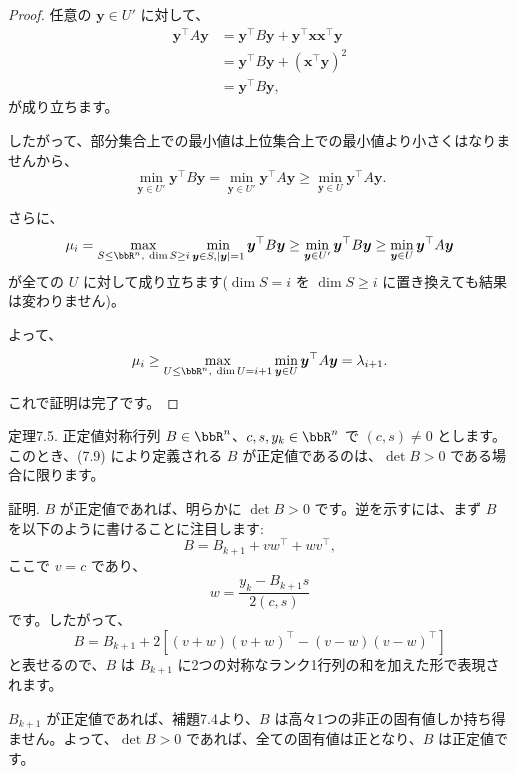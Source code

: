 \documentclass[a4paper, 10pt, dvipdfmx,draft]{article}
\begin{document}
\begin{proof}
    任意の $\bm{y} \in U'$ に対して、
    \begin{align*}
        \bm{y}^\top A \bm{y} & = \bm{y}^\top B \bm{y} + \bm{y}^\top \bm{x}\bm{x}^\top \bm{y} \\
                             & = \bm{y}^\top B \bm{y} + (\bm{x}^\top \bm{y})^2               \\
                             & = \bm{y}^\top B \bm{y},
    \end{align*}
    が成り立ちます。

    したがって、部分集合上での最小値は上位集合上での最小値より小さくはなりませんから、
    \begin{equation*}
        \min_{\bm{y} \in U'} \bm{y}^\top B \bm{y} = \min_{\bm{y} \in U'} \bm{y}^\top A \bm{y} \ge \min_{\bm{y} \in U} \bm{y}^\top A \bm{y}.
    \end{equation*}

    さらに、
    \begin{equation*}
        \mu_i = \max_{S \le \bbR^n,\ \dim S \ge i} \min_{\bm{y} \in S, |\bm{y}| = 1} \bm{y}^\top B \bm{y} \ge \min_{\bm{y} \in U'} \bm{y}^\top B \bm{y} \ge \min_{\bm{y} \in U} \bm{y}^\top A \bm{y}
    \end{equation*}
    が全ての $U$ に対して成り立ちます($\dim S = i$ を $\dim S \ge i$ に置き換えても結果は変わりません)。

    よって、
    \begin{equation*}
        \mu_i \ge \max_{U \le \bbR^n,\ \dim U = i+1} \min_{\bm{y} \in U} \bm{y}^\top A \bm{y} = \lambda_{i+1}.
    \end{equation*}

    これで証明は完了です。
\end{proof}

定理7.5.
正定値対称行列 $B \in \bbR^n$、$c, s, y_k \in \bbR^n$ で $(c, s) \neq 0$ とします。このとき、(7.9) により定義される $B$ が正定値であるのは、$\det B > 0$ である場合に限ります。

証明. $B$ が正定値であれば、明らかに $\det B > 0$ です。逆を示すには、まず $B$ を以下のように書けることに注目します:
$$
    B = B_{k+1} + vw^\top + wv^\top,
$$
ここで $v = c$ であり、
$$
    w = \frac{y_k - B_{k+1}s}{2(c, s)}
$$
です。したがって、
$$
    B = B_{k+1} + 2\left[(v + w)(v + w)^\top - (v - w)(v - w)^\top\right]
$$
と表せるので、$B$ は $B_{k+1}$ に2つの対称なランク1行列の和を加えた形で表現されます。

$B_{k+1}$ が正定値であれば、補題7.4より、$B$ は高々1つの非正の固有値しか持ち得ません。よって、$\det B > 0$ であれば、全ての固有値は正となり、$B$ は正定値です。
\end{document}
